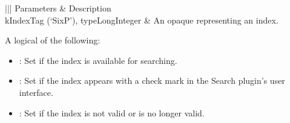 \documentclass[letterpaper,12pt,english,openany,oneside]{sphinxmanual}
\begin{document}
\label{\detokenize{IAC_API_SearchIntro:apple-event-id-4}}

\begin{sphinxVerbatim}[commandchars=\\\{\}]
 
\end{sphinxVerbatim}
\label{\detokenize{IAC_API_SearchIntro:parameters-4}}


\begin{savenotes}\sphinxattablestart
\centering
{}\label{\detokenize{IAC_API_SearchIntro:section-10}}\nobreak
\begin{tabular}[t]{|||}
\hline
\sphinxstyletheadfamily 
Parameters
&\sphinxstyletheadfamily 
Description
\\
\hline
kIndexTag (‘SixP’), typeLongInteger
&
An opaque  representing an index.
\\
\hline
\end{tabular}
\par
\sphinxattableend\end{savenotes}


\begin{sphinxVerbatim}[commandchars=\\\{\}]
  
\end{sphinxVerbatim}

A logical  of the following:
\begin{itemize}
\item {} 
: Set if the index is available for searching.

\item {} 
: Set if the index appears with a check mark in the Search plug\sphinxhyphen{}in’s user interface.

\item {} 
: Set if the index is not valid or is no longer valid.

\end{itemize}
\end{document}
